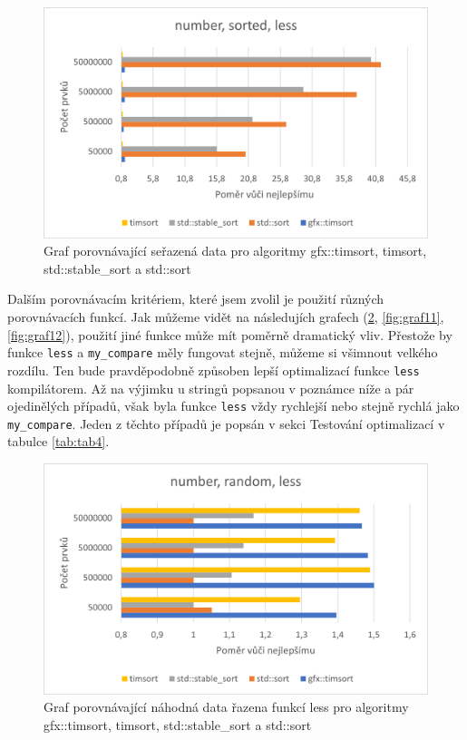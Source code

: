 \documentclass[thesis=B,czech]{FITthesis}[2019/12/23]
\begin{document}
\begin{figure}[htbp]\centering
	\includegraphics{obrazky/graf9.png}
	\caption[Graf porovnávající seřazená data pro algoritmy gfx::timsort, timsort, std::stable\_sort a std::sort]{Graf porovnávající seřazená data pro algoritmy gfx::timsort, timsort, std::stable\_sort a std::sort}\label{fig:graf9}
\end{figure}


Dalším porovnávacím kritériem, které jsem zvolil je použití různých porovnávacích funkcí. Jak můžeme vidět na následujích grafech (\ref{fig:graf10}, \ref{fig:graf11}, \ref{fig:graf12}), použití jiné funkce může mít poměrně dramatický vliv. Přestože by funkce \texttt{less} a \texttt{my\_compare} měly fungovat stejně, můžeme si všimnout velkého rozdílu. Ten bude pravděpodobně způsoben lepší optimalizací funkce \texttt{less} kompilátorem. Až na výjimku u stringů popsanou v poznámce níže a pár ojedinělých případů, však byla funkce \texttt{less} vždy rychlejší nebo stejně rychlá jako \texttt{my\_compare}. Jeden z těchto případů je popsán v sekci Testování optimalizací v tabulce \ref{tab:tab4}.

\begin{figure}[htbp]\centering
	\includegraphics{obrazky/graf10.png}
	\caption[Graf porovnávající náhodná data řazena funkcí less pro algoritmy gfx::timsort, timsort, std::stable\_sort a std::sort]{Graf porovnávající náhodná data řazena funkcí less pro algoritmy gfx::timsort, timsort, std::stable\_sort a std::sort}\label{fig:graf10}
\end{figure}
\end{document}
